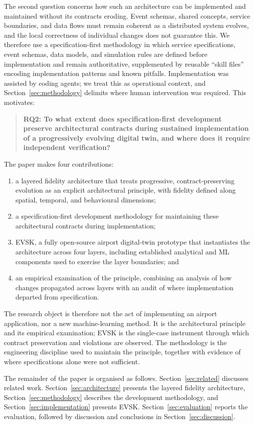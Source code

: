 The second question concerns how such an architecture can be implemented and maintained without its contracts eroding. Event schemas, shared concepts, service boundaries, and data flows must remain coherent as a distributed system evolves, and the local correctness of individual changes does not guarantee this. We therefore use a specification-first methodology in which service specifications, event schemas, data models, and simulation rules are defined before implementation and remain authoritative, supplemented by reusable ``skill files'' encoding implementation patterns and known pitfalls. Implementation was assisted by coding agents; we treat this as operational context, and Section~\ref{sec:methodology} delimits where human intervention was required. This motivates:

\begin{quote}
\textbf{RQ2: To what extent does specification-first development preserve architectural contracts during sustained implementation of a progressively evolving digital twin, and where does it require independent verification?}
\end{quote}

The paper makes four contributions:
\begin{enumerate}
\item a layered fidelity architecture that treats progressive, contract-preserving evolution as an explicit architectural principle, with fidelity defined along spatial, temporal, and behavioural dimensions;
\item a specification-first development methodology for maintaining these architectural contracts during implementation;
\item EVSK, a fully open-source airport digital-twin prototype that instantiates the architecture across four layers, including established analytical and ML components used to exercise the layer boundaries; and
\item an empirical examination of the principle, combining an analysis of how changes propagated across layers with an audit of where implementation departed from specification.
\end{enumerate}

The research object is therefore not the act of implementing an airport application, nor a new machine-learning method. It is the architectural principle and its empirical examination; EVSK is the single-case instrument through which contract preservation and violations are observed. The methodology is the engineering discipline used to maintain the principle, together with evidence of where specifications alone were not sufficient.

The remainder of the paper is organised as follows. Section~\ref{sec:related} discusses related work. Section~\ref{sec:architecture} presents the layered fidelity architecture, Section~\ref{sec:methodology} describes the development methodology, and Section~\ref{sec:implementation} presents EVSK. Section~\ref{sec:evaluation} reports the evaluation, followed by discussion and conclusions in Section~\ref{sec:discussion}.
